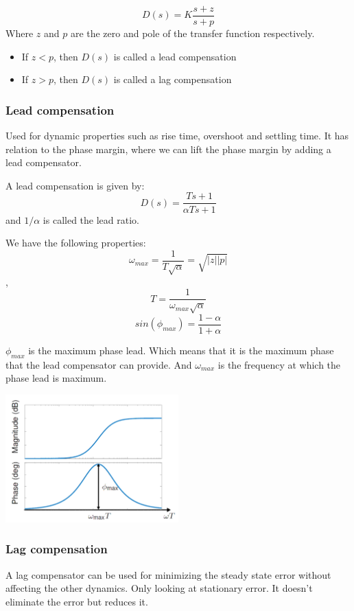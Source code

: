 $$ D(s) = K \frac{s + z}{s + p} $$
Where $z$ and $p$ are the zero and pole of the transfer function respectively.

\begin{itemize}
	\item {If $z<p$, then $D(s)$ is called a lead compensation}
	      \item{If $z>p$, then $D(s)$ is called a lag compensation}
\end{itemize}

\subsubsection{Lead compensation}

Used for dynamic properties such as rise time, overshoot and settling time. It has relation
to the phase margin, where we can lift the phase margin by adding a lead compensator.

A lead compensation is given by:
$$D(s) = \frac{Ts+1}{\alpha Ts+1}$$
and $1/\alpha$ is called the lead ratio.

We have the following properties:
$$\omega_{max} = \frac{1}{T\sqrt{\alpha}} = \sqrt{|z||p|}$$,
$$T = \frac{1}{\omega_{max}\sqrt{\alpha}}$$
$$sin(\phi_{max}) = \frac{1-\alpha}{1+\alpha}$$

$\phi_{max}$ is the maximum phase lead. Which means that it is the
maximum phase that the lead compensator can provide.
And $\omega_{max}$ is the frequency at which the phase lead is maximum.


\begin{center}
	\includegraphics[width=0.5\textwidth]{Images/leadComp.png}
\end{center}

\subsubsection{Lag compensation}
A lag compensator can be used for minimizing the steady state error without affecting
the other dynamics. Only looking at stationary error. It doesn't eliminate the error
but reduces it.


